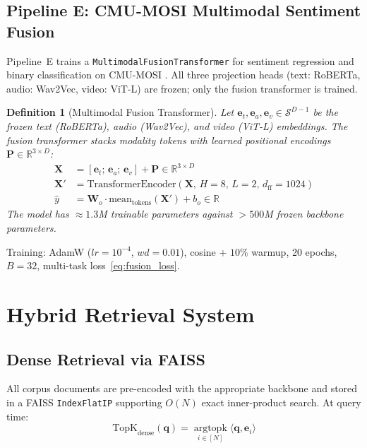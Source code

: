 \documentclass[10pt,conference]{IEEEtran}
\theoremstyle{ieeethm}
\theoremstyle{ieeedef}
\newtheorem{definition}[theorem]{Definition}
\theoremstyle{ieeeremark}
\begin{document}
\subsection{Pipeline E: CMU-MOSI Multimodal Sentiment Fusion}

Pipeline~E trains a \texttt{MultimodalFusionTransformer} for sentiment regression and binary classification on CMU-MOSI \cite{zadeh2016mosi}. All three projection heads (text: RoBERTa, audio: Wav2Vec, video: ViT-L) are frozen; only the fusion transformer is trained.

\begin{definition}[Multimodal Fusion Transformer]
\label{def:fusion_transformer}
Let $\mathbf{e}_t, \mathbf{e}_a, \mathbf{e}_v \in \mathcal{S}^{D-1}$ be the frozen text (RoBERTa), audio (Wav2Vec), and video (ViT-L) embeddings. The fusion transformer stacks modality tokens with learned positional encodings $\mathbf{P} \in \mathbb{R}^{3 \times D}$:
\begin{align}
\mathbf{X} &= [\mathbf{e}_t;\, \mathbf{e}_a;\, \mathbf{e}_v] + \mathbf{P} \in \mathbb{R}^{3 \times D}\\
\mathbf{X}' &= \text{TransformerEncoder}(\mathbf{X},\, H{=}8,\, L{=}2,\, d_\text{ff}{=}1024)\\
\hat{y} &= \mathbf{W}_o \cdot \text{mean}_\text{tokens}(\mathbf{X}') + b_o \in \mathbb{R}
\end{align}
The model has $\approx 1.3$M trainable parameters against $>500$M frozen backbone parameters.
\end{definition}

Training: AdamW ($lr{=}10^{-4}$, $wd{=}0.01$), cosine + $10\%$ warmup, 20 epochs, $B{=}32$, multi-task loss~\eqref{eq:fusion_loss}.

\section{Hybrid Retrieval System}
\label{sec:retrieval}

\subsection{Dense Retrieval via FAISS}

All corpus documents are pre-encoded with the appropriate backbone and stored in a FAISS \texttt{IndexFlatIP} supporting $O(N)$ exact inner-product search. At query time:
\begin{equation}
\text{TopK}_{\text{dense}}(\mathbf{q}) = \operatorname*{argtopk}_{i \in [N]} \langle \mathbf{q}, \mathbf{e}_i \rangle
\label{eq:dense}
\end{equation}
\end{document}
